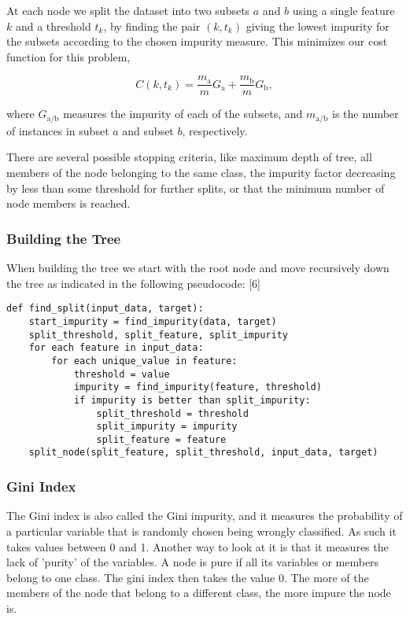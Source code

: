 \documentclass[11pt]{article}
\begin{document}
At each node we split the dataset into two subsets \(a\) and \(b\) using
a single feature \(k\) and a threshold \(t_k\), by finding the pair
\((k,t_k)\) giving the lowest impurity for the subsets according to the
chosen impurity measure. This minimizes our cost function for this
problem,

    \[
C(k,t_k) = \frac{m_{\mathrm{a}}}{m}G_{\mathrm{a}}+ \frac{m_{\mathrm{b}}}{m}G_{\mathrm{b}},
\]

    where \(G_{\mathrm{a/b}}\) measures the impurity of each of the subsets,
and \(m_{\mathrm{a/b}}\) is the number of instances in subset \(a\) and
subset \(b\), respectively.

There are several possible stopping criteria, like maximum depth of
tree, all members of the node belonging to the same class, the impurity
factor decreasing by less than some threshold for further splits, or
that the minimum number of node members is reached.


\hypertarget{building-the-tree}{%
\subsubsection*{Building the Tree}\label{building-the-tree}} 

When building the tree we start with the root node and move recursively down the tree as indicated in the following pseudocode: {[}6{]}

\begin{verbatim}
def find_split(input_data, target):
    start_impurity = find_impurity(data, target)
    split_threshold, split_feature, split_impurity
    for each feature in input_data:
        for each unique_value in feature:
            threshold = value
            impurity = find_impurity(feature, threshold)
            if impurity is better than split_impurity:
                split_threshold = threshold
                split_impurity = impurity
                split_feature = feature
    split_node(split_feature, split_threshold, input_data, target)
\end{verbatim}

    \hypertarget{gini-index}{%
\subsubsection{Gini Index}\label{gini-index}}

The Gini index is also called the Gini impurity, and it measures the
probability of a particular variable that is randomly chosen being
wrongly classified. As such it takes values between 0 and 1. Another way
to look at it is that it measures the lack of 'purity' of the variables.
A node is pure if all its variables or members belong to one class. The
gini index then takes the value 0. The more of the members of the node
that belong to a different class, the more impure the node is.
\end{document}
